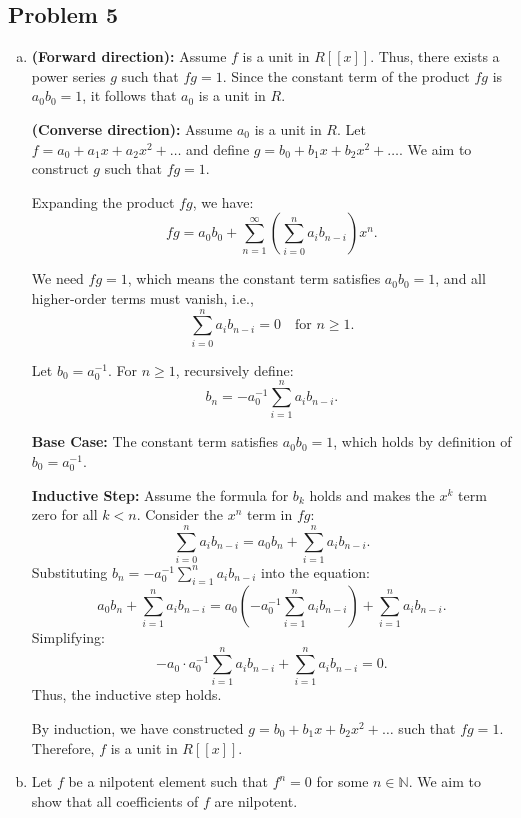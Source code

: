 \documentclass[12pt, letterpaper]{article}
\theoremstyle{definition}
\begin{document}
\newpage
\subsection*{Problem 5}
\begin{enumerate}[(a)]
    \item \textbf{(Forward direction):}  
    Assume $f$ is a unit in $R[[x]]$. Thus, there exists a power series $g$ such that $fg = 1$. Since the constant term of the product $fg$ is $a_0b_0 = 1$, it follows that $a_0$ is a unit in $R$. 
    
    \textbf{(Converse direction):}  
    Assume $a_0$ is a unit in $R$. Let $f = a_0 + a_1x + a_2x^2 + \dots$ and define $g = b_0 + b_1x + b_2x^2 + \dots$. We aim to construct $g$ such that $fg = 1$. 
    
    Expanding the product $fg$, we have:  
    \[
    fg = a_0b_0 + \sum_{n=1}^\infty \left( \sum_{i=0}^n a_i b_{n-i} \right) x^n.
    \]
    
    We need $fg = 1$, which means the constant term satisfies $a_0b_0 = 1$, and all higher-order terms must vanish, i.e.,  
    \[
    \sum_{i=0}^n a_i b_{n-i} = 0 \quad \text{for } n \geq 1.
    \]
    
    Let $b_0 = a_0^{-1}$. For $n \geq 1$, recursively define:
    \[
    b_n = -a_0^{-1} \sum_{i=1}^n a_i b_{n-i}.
    \]
    
    \textbf{Base Case:} The constant term satisfies $a_0b_0 = 1$, which holds by definition of $b_0 = a_0^{-1}$. 
    
    \textbf{Inductive Step:} Assume the formula for $b_k$ holds and makes the $x^k$ term zero for all $k < n$. Consider the $x^n$ term in $fg$:  
    \[
    \sum_{i=0}^n a_i b_{n-i} = a_0b_n + \sum_{i=1}^n a_i b_{n-i}.
    \]
    Substituting $b_n = -a_0^{-1} \sum_{i=1}^n a_i b_{n-i}$ into the equation:
    \[
    a_0b_n + \sum_{i=1}^n a_i b_{n-i} = a_0\left(-a_0^{-1} \sum_{i=1}^n a_i b_{n-i}\right) + \sum_{i=1}^n a_i b_{n-i}.
    \]
    Simplifying:
    \[
    -a_0 \cdot a_0^{-1} \sum_{i=1}^n a_i b_{n-i} + \sum_{i=1}^n a_i b_{n-i} = 0.
    \]
    Thus, the inductive step holds.
    
    By induction, we have constructed $g = b_0 + b_1x + b_2x^2 + \dots$ such that $fg = 1$. Therefore, $f$ is a unit in $R[[x]]$.
    
    \item Let $f$ be a nilpotent element such that $f^n = 0$ for some $n \in \mathbb{N}$. We aim to show that all coefficients of $f$ are nilpotent.


\end{enumerate}
\end{document}
